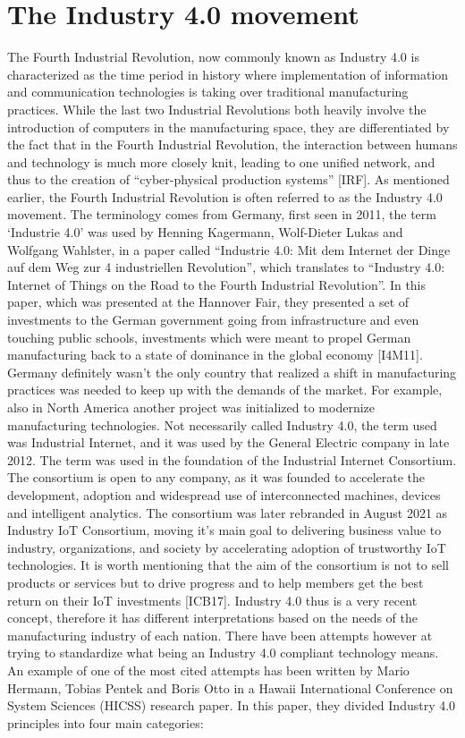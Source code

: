 \documentclass[a4paper, 12pt]{book}
\begin{document}
\section{The Industry 4.0 movement}
The Fourth Industrial Revolution, now commonly known as Industry 4.0 is characterized as the time period in history where implementation of information and communication technologies is taking over traditional manufacturing practices. While the last two Industrial Revolutions both heavily involve the introduction of computers in the manufacturing space, they are differentiated by the fact that in the Fourth Industrial Revolution, the interaction between humans and technology is much more closely knit, leading to one unified network, and thus to the creation of “cyber-physical production systems” [IRF].
As mentioned earlier, the Fourth Industrial Revolution is often referred to as the Industry 4.0 movement. The terminology comes from Germany, first seen in 2011, the term ‘Industrie 4.0’ was used by Henning Kagermann, Wolf-Dieter Lukas and Wolfgang Wahlster, in a paper called “Industrie 4.0: Mit dem Internet der Dinge auf dem Weg zur 4 industriellen Revolution”, which translates to “Industry 4.0: Internet of Things on the Road to the Fourth Industrial Revolution”. In this paper, which was presented at the Hannover Fair, they presented a set of investments to the German government going from infrastructure and even touching public schools, investments which were meant to propel German manufacturing back to a state of dominance in the global economy [I4M11].
Germany definitely wasn’t the only country that realized a shift in manufacturing practices was needed to keep up with the demands of the market. For example, also in North America another project was initialized to modernize manufacturing technologies. Not necessarily called Industry 4.0, the term used was Industrial Internet, and it was used by the General Electric company in late 2012. The term was used in the foundation of the Industrial Internet Consortium. The consortium is open to any company, as it was founded to accelerate the development, adoption and widespread use of interconnected machines, devices and intelligent analytics. The consortium was later rebranded in August 2021 as Industry IoT Consortium, moving it’s main goal to delivering business value to industry, organizations, and society by accelerating adoption of trustworthy IoT technologies. It is worth mentioning that the aim of the consortium is not to sell products or services but to drive progress and to help members get the best return on their IoT investments [ICB17].
Industry 4.0 thus is a very recent concept, therefore it has different interpretations based on the needs of the manufacturing industry of each nation. There have been attempts however at trying to standardize what being an Industry 4.0 compliant technology means. An example of one of the most cited attempts has been written by Mario Hermann, Tobias Pentek and Boris Otto in a Hawaii International Conference on System Sciences (HICSS) research paper. In this paper, they divided Industry 4.0 principles into four main categories:
\end{document}

